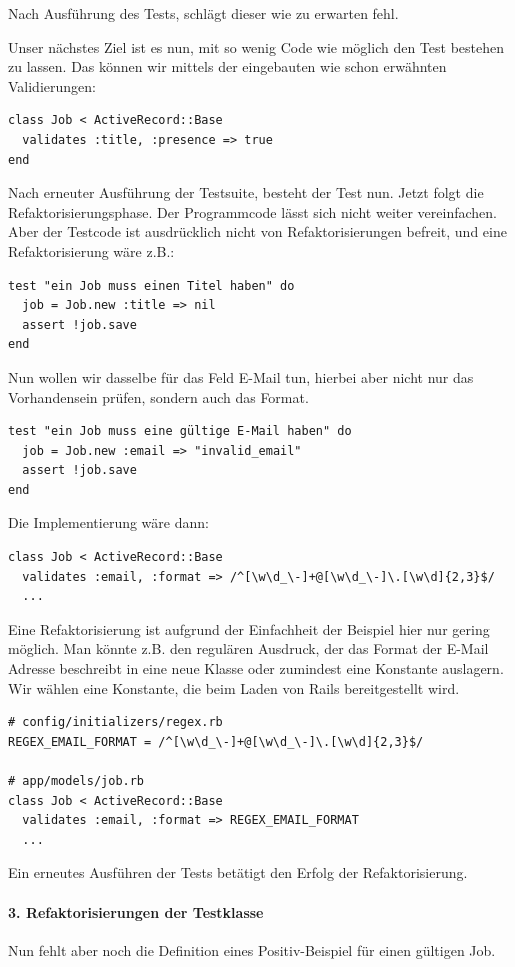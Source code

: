 Nach Ausführung des Tests, schlägt dieser wie zu erwarten fehl.

Unser nächstes Ziel ist es nun, mit so wenig Code wie möglich den Test bestehen zu lassen. Das können wir mittels der eingebauten wie schon erwähnten Validierungen:


\begin{lstlisting}
class Job < ActiveRecord::Base
  validates :title, :presence => true
end
\end{lstlisting}
\tddgreen
Nach erneuter Ausführung der Testsuite, besteht der Test nun. Jetzt folgt die Refaktorisierungsphase. Der Programmcode lässt sich nicht weiter vereinfachen. Aber der Testcode ist ausdrücklich nicht von Refaktorisierungen befreit, und eine Refaktorisierung wäre z.B.:
\tddrefactor
\begin{lstlisting}
test "ein Job muss einen Titel haben" do
  job = Job.new :title => nil
  assert !job.save
end
\end{lstlisting}



Nun wollen wir dasselbe für das Feld E-Mail tun, hierbei aber nicht nur das Vorhandensein prüfen, sondern auch das Format.

\begin{lstlisting}
test "ein Job muss eine gültige E-Mail haben" do
  job = Job.new :email => "invalid_email"
  assert !job.save
end
\end{lstlisting}
\tddred
Die Implementierung wäre dann:
\begin{lstlisting}
class Job < ActiveRecord::Base
  validates :email, :format => /^[\w\d_\-]+@[\w\d_\-]\.[\w\d]{2,3}$/
  ...
\end{lstlisting}
\tddgreen
Eine Refaktorisierung ist aufgrund der Einfachheit der Beispiel hier nur gering möglich. Man könnte z.B. den regulären Ausdruck, der das Format der E-Mail Adresse beschreibt in eine neue Klasse oder zumindest eine Konstante auslagern. Wir wählen eine Konstante, die beim Laden von Rails bereitgestellt wird.
\tddrefactor
\begin{lstlisting}
# config/initializers/regex.rb
REGEX_EMAIL_FORMAT = /^[\w\d_\-]+@[\w\d_\-]\.[\w\d]{2,3}$/

# app/models/job.rb
class Job < ActiveRecord::Base
  validates :email, :format => REGEX_EMAIL_FORMAT
  ...
\end{lstlisting}
Ein erneutes Ausführen der Tests betätigt den Erfolg der Refaktorisierung.

\paragraph{3. Refaktorisierungen der Testklasse}
Nun fehlt aber noch die Definition eines Positiv-Beispiel für einen gültigen Job.

